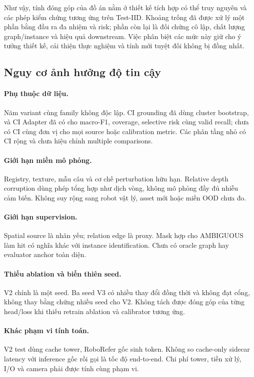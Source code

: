 Như vậy, tính đóng góp của đồ án nằm ở thiết kế tích hợp có thể truy
nguyên và các phép kiểm chứng tương ứng trên Test-IID. Khoảng trống đã
được xử lý một phần bằng đầu ra đa nhiệm và risk; phần còn lại là đối
chứng cô lập, chất lượng graph/instance và hiệu quả downstream. Việc
phân biệt các mức này giữ cho ý tưởng thiết kế, cải thiện thực nghiệm và
tính mới tuyệt đối không bị đồng nhất.

\subsection{Nguy cơ ảnh hưởng độ tin cậy}

\paragraph{Phụ thuộc dữ liệu.}
Năm variant cùng family không độc lập.
CI grounding đã dùng cluster bootstrap,
và CI Adapter đã có cho macro-F1, coverage, selective risk cùng valid recall; chưa có CI cùng đơn vị cho mọi source hoặc calibration metric.
Các phân tầng nhỏ có CI rộng và chưa
hiệu chỉnh multiple comparisons.

\paragraph{Giới hạn miền mô phỏng.}
Registry, texture, mẫu câu và cơ chế
perturbation hữu hạn. Relative depth
corruption dùng phép tổng hợp như dịch
vòng, không mô phỏng đầy đủ nhiễu cảm
biến. Không suy rộng sang robot vật lý,
asset mới hoặc miền OOD chưa đo.

\paragraph{Giới hạn supervision.}
Spatial source là nhãn yếu; relation
edge là proxy. Mask hợp cho AMBIGUOUS
làm hit có nghĩa khác với instance
identification. Chưa có oracle graph
hay evaluator anchor toàn diện.

\paragraph{Thiếu ablation và biến thiên seed.}
V2 chính là một seed. Ba seed V3 có
nhiều thay đổi đồng thời và không
đạt cổng, không thay bằng chứng nhiều
seed cho V2. Không tách được đóng góp
của từng head/loss khi thiếu retrain
ablation và calibrator tương ứng.

\paragraph{Khác phạm vi tính toán.}
V2 test dùng cache tower, RoboRefer
gốc sinh token. Không so cache-only
sidecar latency với inference gốc
rồi gọi là tốc độ end-to-end.
Chi phí tower, tiền xử lý, I/O và
camera phải được tính cùng phạm vi.

